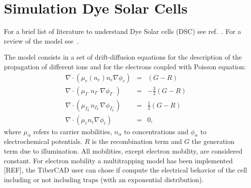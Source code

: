 \chapter{Simulation Dye Solar Cells}

For a brief list of literature to understand Dye Solar cells (DSC)
see ref.~\cite{kalyanasundaram}. For a review of the model
see~\cite{gagliardi}.

The model consists in a set of drift-diffusion equations for the
description of the propagation of different ions and for the
electrons coupled with Poisson equation:
\begin{eqnarray}
    \nabla \cdot (\mu_{e}(n_e)n_{e}\nabla\phi_{e}) & = & (G - R) \\
    \nabla \cdot (\mu_{I^{-}}n_{I^{-}}\nabla\phi_{I^{-}}) & = & -\frac{3}{2}(G - R) \\
    \nabla \cdot (\mu_{I^{-}_{3}}n_{I^{-}_{3}}\nabla\phi_{I^{-}_{3}}) & = & \frac{1}{2}(G - R) \\
    \nabla \cdot (\mu_{c}n_{c}\nabla\phi_{c}) & = & 0,
\label{eq1}
\end{eqnarray}
where $\mu_{\alpha}$ refers to carrier mobilities, $n_{\alpha}$ to
concentrations and $\phi_{\alpha}$ to electrochemical potentials.
$R$ is the recombination term and $G$ the generation term due to
illumination. All mobilities, except electron mobility, are considered constant. For electron mobility
a multitrapping model has been implemented [REF], the TiberCAD user can chose if 
compute the electrical behavior of the cell including or not including traps (with an exponential distribution).

